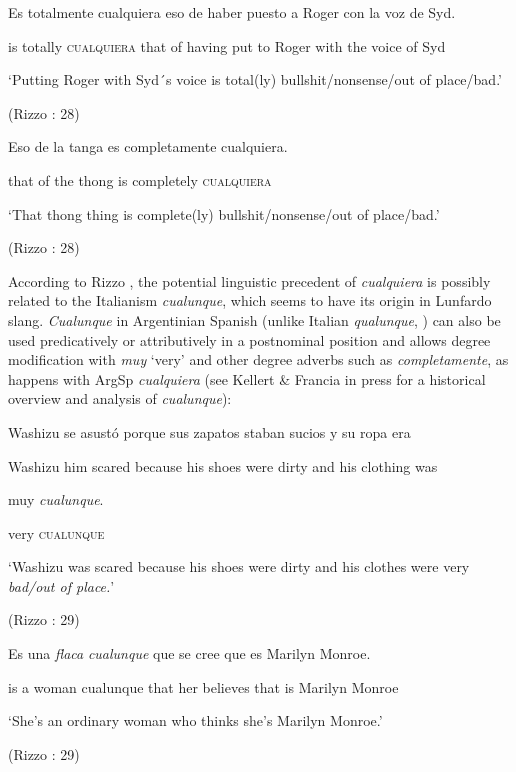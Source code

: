 \documentclass[output=paper]{langscibook}
\begin{document}
    Es  totalmente  cualquiera  eso  de  haber  puesto  a  Roger  con  la  voz  de  Syd.

    is  totally  \textsc{cualquiera}  that  of  having  put  to  Roger  with  the  voice  of  Syd

    ‘Putting Roger with Syd´s voice is total(ly) bullshit/nonsense/out of place/bad.’

    (Rizzo \citealt{Salierno2013}: 28)

    Eso  de  la  tanga  es  completamente  cualquiera.

    that  of  the  thong  is  completely  \textsc{cualquiera}

    ‘That thong thing is complete(ly) bullshit/nonsense/out of place/bad.’

    (Rizzo \citealt{Salierno2013}: 28)

According to Rizzo \citet{Salierno2013}, the potential linguistic precedent of \textit{cualquiera} is possibly related to the Italianism \textit{cualunque}, which seems to have its origin in Lunfardo slang. \textit{Cualunque} in Argentinian Spanish (unlike Italian \textit{qualunque}, \citealt{Author2021}) can also be used predicatively or attributively in a postnominal position and allows degree modification with \textit{muy} ‘very’ and other degree adverbs such as \textit{completamente}, as happens with ArgSp \textit{cualquiera} (see Kellert \& Francia in press for a historical overview and analysis of \textit{cualunque}):

    Washizu  se  asustó  porque  sus  zapatos  staban  sucios  y  su  ropa  era

    Washizu  him  scared  because  his  shoes  were  dirty  and  his  clothing  was

    muy  \textit{cualunque}.

    very  \textsc{cualunque}

    ‘Washizu was scared because his shoes were dirty and his clothes were very \textit{bad/out of place.}’

    (Rizzo \citealt{Salierno2013}: 29)

    Es  una  \textit{flaca}  \textit{cualunque}  que  se  cree  que  es  Marilyn  Monroe.

    is  a  woman  cualunque  that  her  believes  that  is  Marilyn  Monroe

    ‘She’s an ordinary woman who thinks she’s Marilyn Monroe.’

    (Rizzo \citealt{Salierno2013}: 29)
\end{document}
